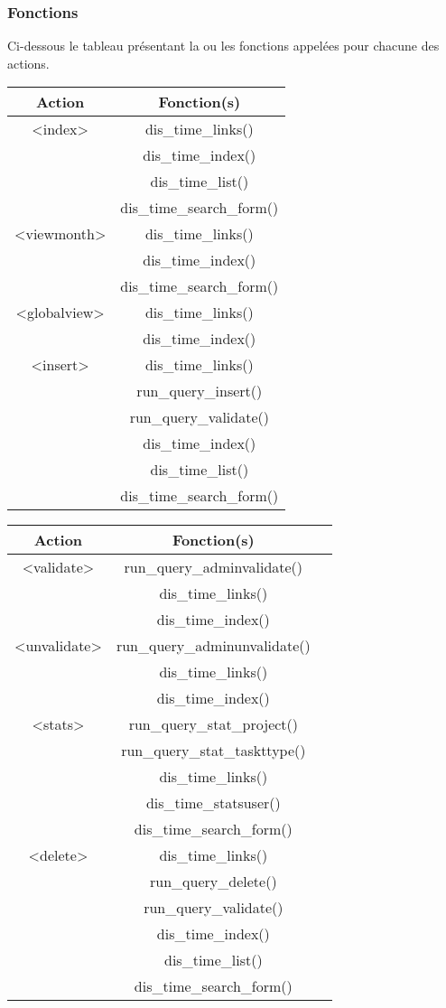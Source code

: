 \subsubsection{Fonctions}
 Ci-dessous le tableau présentant la ou les fonctions appelées pour chacune des actions. \\
\begin{tabular}{|c|c|}
 \hline
 \textbf{Action} & \textbf{Fonction(s)}\\
 \hline
 \hline
  <index> & dis\_time\_links() \\
          & dis\_time\_index() \\  
          & dis\_time\_list() \\ 
 	  & dis\_time\_search\_form() \\
 \hline
  <viewmonth> & dis\_time\_links() \\ 
              & dis\_time\_index() \\
   	      & dis\_time\_search\_form() \\
 \hline
  <globalview> & dis\_time\_links() \\ 
               & dis\_time\_index() \\
 \hline
  <insert> & dis\_time\_links() \\
 	   & run\_query\_insert() \\
	   & run\_query\_validate() \\
	   & dis\_time\_index() \\
	   & dis\_time\_list() \\
	   & dis\_time\_search\_form() \\
 \hline
 \end{tabular}

\begin{tabular}{|c|c|p{3cm}|}
 \hline
 \textbf{Action} & \textbf{Fonction(s)} \\
 \hline
 \hline
  <validate> & run\_query\_adminvalidate() \\
	     & dis\_time\_links() \\
	     & dis\_time\_index() \\
 \hline
  <unvalidate> & run\_query\_adminunvalidate() \\
	     & dis\_time\_links() \\
	     & dis\_time\_index() \\
 \hline
  <stats> & run\_query\_stat\_project() \\ 
	  & run\_query\_stat\_taskttype() \\
          & dis\_time\_links() \\ 
          & dis\_time\_statsuser() \\
   	  & dis\_time\_search\_form() \\
 \hline
  <delete> & dis\_time\_links() \\
 	   & run\_query\_delete() \\
	   & run\_query\_validate() \\
	   & dis\_time\_index() \\
	   & dis\_time\_list() \\
	   & dis\_time\_search\_form() \\
 \hline
\end{tabular}

